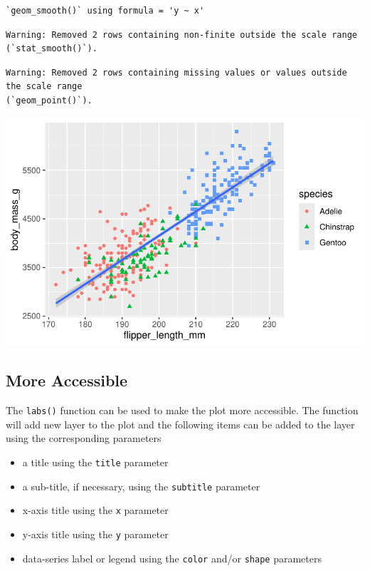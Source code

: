 \documentclass[
  letterpaper,
  DIV=11,
  numbers=noendperiod]{scrreprt}
\providecommand{\tightlist}{%
  \setlength{\itemsep}{0pt}\setlength{\parskip}{0pt}}\usepackage{longtable,booktabs,array}
\begin{document}
\begin{verbatim}
`geom_smooth()` using formula = 'y ~ x'
\end{verbatim}

\begin{verbatim}
Warning: Removed 2 rows containing non-finite outside the scale range
(`stat_smooth()`).
\end{verbatim}

\begin{verbatim}
Warning: Removed 2 rows containing missing values or values outside the scale range
(`geom_point()`).
\end{verbatim}

\includegraphics{src/r-for-data-science/01-data-viz_files/figure-pdf/unnamed-chunk-11-1.pdf}

\subsection{More Accessible}\label{more-accessible}

The \texttt{labs()} function can be used to make the plot more
accessible. The function will add new layer to the plot and the
following items can be added to the layer using the corresponding
parameters

\begin{itemize}
\tightlist
\item
  a title using the \texttt{title} parameter
\item
  a sub-title, if necessary, using the \texttt{subtitle} parameter
\item
  x-axis title using the \texttt{x} parameter
\item
  y-axis title using the \texttt{y} parameter
\item
  data-series label or legend using the \texttt{color} and/or
  \texttt{shape} parameters
\end{itemize}
\end{document}
